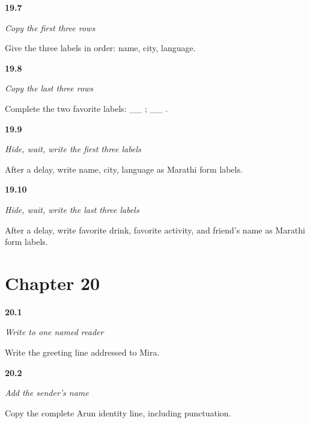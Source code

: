 \noindent\begin{minipage}[t]{\linewidth}
\raggedright
\hypertarget{review-MR-A1F02-first-three-copy-check}{\textbf{19.7}} \emph{Copy the first three rows}\par
\small Give the three labels in order: name, city, language.
\end{minipage}\par\medskip

\noindent\begin{minipage}[t]{\linewidth}
\raggedright
\hypertarget{review-MR-A1F02-last-three-copy-check}{\textbf{19.8}} \emph{Copy the last three rows}\par
\small Complete the two favorite labels: \_\_ ; \_\_ .
\end{minipage}\par\medskip

\noindent\begin{minipage}[t]{\linewidth}
\raggedright
\hypertarget{review-MR-A1F03-first-three-delayed-check}{\textbf{19.9}} \emph{Hide, wait, write the first three labels}\par
\small After a delay, write name, city, language as Marathi form labels.
\end{minipage}\par\medskip

\noindent\begin{minipage}[t]{\linewidth}
\raggedright
\hypertarget{review-MR-A1F03-last-three-delayed-check}{\textbf{19.10}} \emph{Hide, wait, write the last three labels}\par
\small After a delay, write favorite drink, favorite activity, and friend's name as Marathi form labels.
\end{minipage}\par\medskip

\section*{Chapter 20}

\noindent\begin{minipage}[t]{\linewidth}
\raggedright
\hypertarget{review-MR-A1M01-reader-greeting-check}{\textbf{20.1}} \emph{Write to one named reader}\par
\small Write the greeting line addressed to Mira.
\end{minipage}\par\medskip

\noindent\begin{minipage}[t]{\linewidth}
\raggedright
\hypertarget{review-MR-A1M02-name-line-check}{\textbf{20.2}} \emph{Add the sender's name}\par
\small Copy the complete Arun identity line, including punctuation.
\end{minipage}\par\medskip

